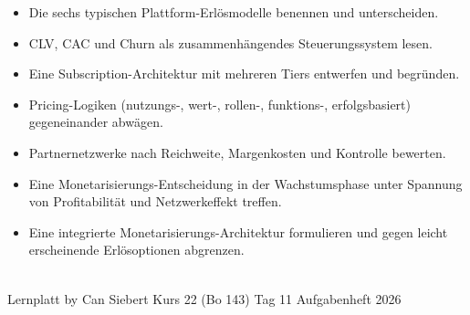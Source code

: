 \documentclass[11pt,a4paper,oneside]{article}
\begin{document}
\medskip
\begin{infobox}
\begin{itemize}
  \item Die sechs typischen Plattform-Erlösmodelle benennen und unterscheiden.
  \item CLV, CAC und Churn als zusammenhängendes Steuerungssystem lesen.
  \item Eine Subscription-Architektur mit mehreren Tiers entwerfen und begründen.
  \item Pricing-Logiken (nutzungs-, wert-, rollen-, funktions-, erfolgsbasiert) gegeneinander abwägen.
  \item Partnernetzwerke nach Reichweite, Margenkosten und Kontrolle bewerten.
  \item Eine Monetarisierungs-Entscheidung in der Wachstumsphase unter Spannung von Profitabilität und Netzwerkeffekt treffen.
  \item Eine integrierte Monetarisierungs-Architektur formulieren und gegen leicht erscheinende Erlösoptionen abgrenzen.
\end{itemize}
\end{infobox}

\vspace{1cm}
\noindent{\color{lpAccent}\rule{\linewidth}{0.6pt}}\\[4pt]
{\footnotesize\sffamily\color{lpGray}Lernplatt \textperiodcentered{} by Can Siebert \textperiodcentered{} Kurs 22 (Bo 143) \textperiodcentered{} Tag 11 \textperiodcentered{} Aufgabenheft \textperiodcentered{} \textcopyright{} 2026}
\end{document}
